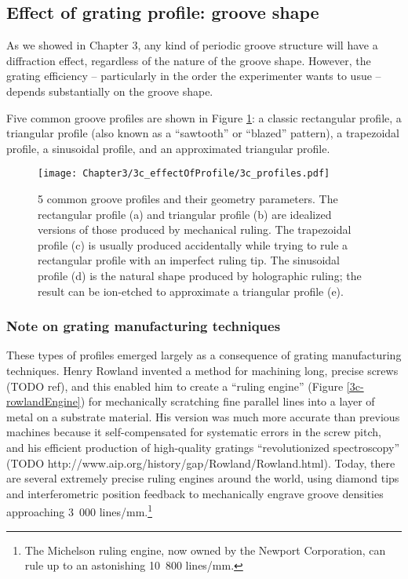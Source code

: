 \subsection{Effect of grating profile: groove shape}

As we showed in Chapter 3, any kind of periodic groove structure will have a diffraction effect, regardless of the nature of the groove shape.  However, the grating efficiency -- particularly in the order the experimenter wants to usue -- depends substantially on the groove shape.  

Five common groove profiles are shown in Figure \ref{3c-profile}: a classic rectangular profile, a triangular profile (also known as a ``sawtooth'' or ``blazed'' pattern), a trapezoidal profile, a sinusoidal profile, and an approximated triangular profile.

\begin{figure}[htbp] %
   \centering
   \texttt{[image: Chapter3/3c\_effectOfProfile/3c\_profiles.pdf]}
   \caption{5 common groove profiles and their geometry parameters.  The rectangular profile (a) and triangular profile (b) are idealized versions of those produced by mechanical ruling.  The trapezoidal profile (c) is usually produced accidentally while trying to rule a rectangular profile with an imperfect ruling tip.  The sinusoidal profile (d) is the natural shape produced by holographic ruling; the result can be ion-etched to approximate a triangular profile (e).}
   \label{3c-profile}
\end{figure}

\subsubsection{Note on grating manufacturing techniques}
These types of profiles emerged largely as a consequence of grating manufacturing techniques.  Henry Rowland invented a method for machining long, precise screws (TODO ref), and this enabled him to create a ``ruling engine'' (Figure \ref{3c-rowlandEngine}) for mechanically scratching fine parallel lines into a layer of metal on a substrate material.  His version was much more accurate than previous machines because it self-compensated for systematic errors in the screw pitch, and his efficient production of high-quality gratings ``revolutionized spectroscopy'' (TODO http://www.aip.org/history/gap/Rowland/Rowland.html).  Today, there are several extremely precise ruling engines around the world, using diamond tips and interferometric position feedback to mechanically engrave groove densities approaching 3~000 lines/mm.\footnote{The Michelson ruling engine, now owned by the Newport Corporation, can rule up to an astonishing 10~800 lines/mm.}

